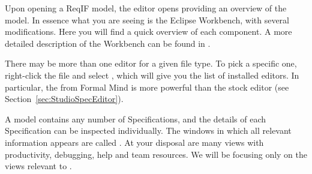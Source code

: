 Upon opening a ReqIF model, the editor opens providing an overview of the model.  In essence what you are seeing is the Eclipse Workbench, with several modifications.  Here you will find a quick overview of each component.  A more detailed description of the Workbench can be found in 
.

\begin{info}
  There may be more than one editor for a given file type.  To pick a specific one, right-click the file and select , which will give you the list of installed editors.  In particular, the  from Formal Mind is more powerful than the stock editor (see Section~\ref{sec:StudioSpecEditor}).
\end{info}

A model contains any number of Specifications, and the details of each Specification can be inspected individually.  The windows in which all relevant information appears are called .  At your disposal are many views with productivity, debugging, help and team resources.  We will be focusing only on the views relevant to \pror{}.


